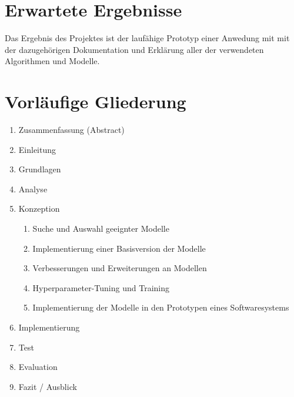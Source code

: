\section{Erwartete Ergebnisse}
Das Ergebnis des Projektes ist der laufähige Prototyp einer Anwedung mit mit der dazugehörigen Dokumentation und Erklärung
aller der verwendeten Algorithmen und Modelle.

\section{Vorläufige Gliederung}

\begin{enumerate}
	\item Zusammenfassung (Abstract)
	\item Einleitung
	\item Grundlagen
	\item Analyse
	\item Konzeption
	\begin{enumerate}[label*=\arabic*.]
		\item Suche und Auswahl geeignter Modelle
		\item Implementierung einer Basisversion der Modelle
		\item Verbesserungen und Erweiterungen an Modellen
		\item Hyperparameter-Tuning und Training
		\item Implementierung der Modelle in den Prototypen eines Softwaresystems
	\end{enumerate}
	\item Implementierung
	\item Test
	\item Evaluation
	\item Fazit / Ausblick
\end{enumerate}


\printbibliography[heading=bibintoc, filter=scientific, title={Literaturangaben}]


